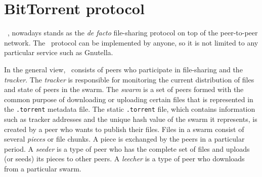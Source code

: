 

\section{BitTorrent protocol}
\bt~\cite{2003:bittorrent:cohen}, nowadays stands as the \textit{de facto} file-sharing protocol on top of the peer-to-peer network. The \bt~protocol can be implemented by anyone, so it is not limited to any particular service such as Gnutella.

In the general view, \bt~consists of peers who participate in file-sharing and the \textit{tracker}. The \textit{tracker} is responsible for monitoring the current distribution of files and state of peers in the swarm. The \textit{swarm} is a set of peers formed with the common purpose of downloading or uploading certain files that is represented in the \texttt{.torrent} metadata file. The static \texttt{.torrent} file, which contains information such as tracker addresses and the unique hash value of the swarm it represents, is created by a peer who wants to publish their files. Files in a swarm consist of several \textit{pieces} or file chunks. A piece is exchanged by the peers in a particular period. A \textit{seeder} is a type of peer who has the complete set of files and uploads (or seeds) its pieces to other peers. A \textit{leecher} is a type of peer who downloads from a particular swarm.


